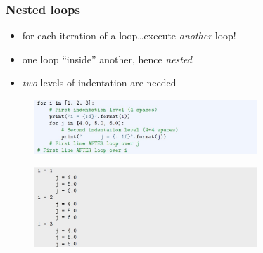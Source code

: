 \documentclass[english,14pt]{beamer}
\newcommand\red[1]{{\color{red} #1}}
\begin{document}
\begin{frame}[fragile]

\frametitle{Nested loops}

\vspace*{-3mm}
\begin{itemize}
	\item for each iteration of a loop\ldots execute \emph{another} loop!
	\item one loop ``inside'' another, hence \red{\emph{nested}}
	\item \emph{two} levels of indentation are needed
\end{itemize}
	
\begin{figure}[ht]
	\centering
	\includegraphics[width=0.75\textwidth]{figures/LLp61a}
\end{figure}
\vspace*{-3mm}
\begin{figure}[ht]
	\centering
	\includegraphics[width=0.75\textwidth]{figures/LLp61b}
\end{figure}

\end{frame}

\end{document}
